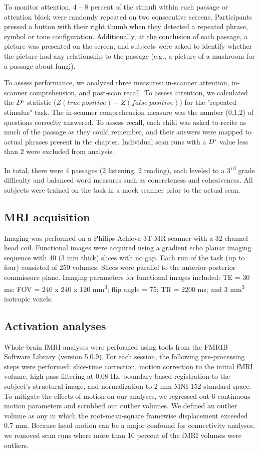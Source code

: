 To monitor attention, 4 – 8 percent of the stimuli within each passage or attention block were randomly repeated on two consecutive screens.  Participants pressed a button with their right thumb when they detected a repeated phrase, symbol or tone configuration. Additionally, at the conclusion of each passage, a picture was presented on the screen, and subjects were asked to identify whether the picture had any relationship to the passage (e.g., a picture of a mushroom for a passage about fungi). 

To assess performance, we analyzed three measures: in-scanner attention, in-scanner comprehension, and post-scan recall. To assess attention, we calculated the $D`$ statistic ($Z(true\ positive) - Z(false\ positive)$) for the "repeated stimulus" task. The in-scanner comprehension measure was the number (0,1,2) of questions correclty answered. To assess recall, each child was asked to recite as much of the passage as they could remember, and their answers were mapped to actual phrases present in the chapter. Individual scan runs with a $D`$ value less than 2 were excluded from analysis.

In total, there were 4 passages (2 listening, 2 reading), each leveled to a 3\textsuperscript{rd} grade difficulty and balanced word measures such as concreteness and cohesiveness.  All subjects were trained on the task in a mock scanner prior to the actual scan. 


\subsection{MRI acquisition}

Imaging was performed on a Philips Achieva 3T MR scanner with a 32-channel head coil. Functional images were acquired using a gradient echo planar imaging sequence with 40 (3 mm thick) slices with no gap. Each run of the task (up to four) consisted of 250 volumes. Slices were parallel to the anterior-posterior commissure plane. Imaging parameters for functional images included: TE = 30 ms; FOV = 240 x 240 x 120 mm\textsuperscript{3}; flip angle = 75\degree; TR = 2200 ms; and 3 mm\textsuperscript{3} isotropic voxels.

\subsection{Activation analyses}

Whole-brain fMRI analyses were performed using tools from the FMRIB Software Library (version 5.0.9). For each session, the following pre-processing steps were performed:  slice-time correction, motion correction to the initial fMRI volume, high-pass filtering at 0.08 Hz, boundary-based registration to the subject's structural image, and normalization to 2 mm MNI 152 standard space. To mitigate the effects of motion on our analyses, we regressed out 6 continuous motion parameters and scrubbed out outlier volumes. We defined an outlier volume as any in which the root-mean-square framewise displacement exceeded 0.7 mm. Because head motion can be a major confound for connectivity analyses, we removed scan runs where more than 10 percent of the fMRI volumes were outliers.

